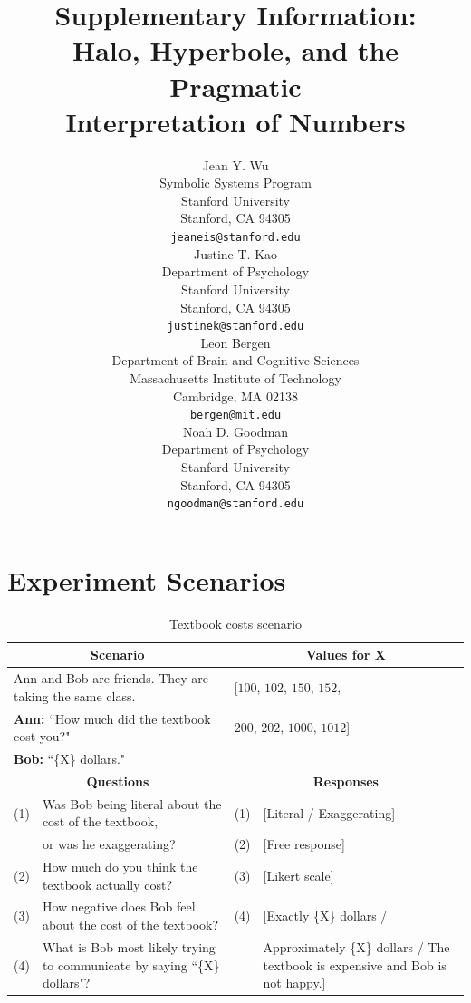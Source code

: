 \documentclass{article} %
\title{Supplementary Information:\\ Halo, Hyperbole, and the Pragmatic \\ Interpretation of Numbers}
\author{
Jean Y. Wu \\
Symbolic Systems Program\\
Stanford University\\
Stanford, CA 94305 \\
\texttt{jeaneis@stanford.edu} \\
\And
Justine T. Kao \\
Department of Psychology\\
Stanford University \\
Stanford, CA 94305 \\
\texttt{justinek@stanford.edu} \\
\AND
Leon Bergen \\
Department of Brain and Cognitive Sciences\\
Massachusetts Institute of Technology \\
Cambridge, MA 02138\\
\texttt{bergen@mit.edu} \\
\And
Noah D. Goodman \\
Department of Psychology\\
Stanford University \\ 
Stanford, CA 94305\\
\texttt{ngoodman@stanford.edu} \\
}
\begin{document}
\maketitle

\section{Experiment Scenarios}

\begin{table}[h]
\begin{tabular}{| p{0.15cm}  p{8.15cm}| p{0.15cm}p{4cm} |}\hline
\multicolumn{2}{|c|}{\textbf{Scenario}} & \multicolumn{2}{c|}{\textbf{Values for X}} \\\hline
\multicolumn{2}{|l|}{Ann and Bob are friends. They are taking the same class.} & \multicolumn{2}{l|}{[$100$, $102$, $150$, $152$,}\\
\multicolumn{2}{|l|}{\textbf{Ann:} ``How much did the textbook cost you?"} & \multicolumn{2}{l|}{$200$, $202$, $1000$, $1012$]}\\
\multicolumn{2}{|l|}{\textbf{Bob:} ``\{X\} dollars."} & \multicolumn{2}{l|}{}\\\hline
\multicolumn{2}{|c|}{\textbf{Questions}} & \multicolumn{2}{c|}{\textbf{Responses}} \\\hline
(1) & Was Bob being literal about the cost of the textbook, & (1) &[Literal / Exaggerating] \\
 & or was he exaggerating? & (2) & [Free response] \\
(2) & How much do you think the textbook actually cost? & (3) & [Likert scale] \\
(3) & How negative does Bob feel about the cost of the textbook? & (4) & [Exactly \{X\} dollars / \\
(4) & What is Bob most likely trying to communicate by saying  ``\{X\} dollars"? & & Approximately \{X\} dollars / The textbook is expensive and Bob is not happy.]\\\hline
\end{tabular}
\caption{Textbook costs scenario}
\label{tab:textbooktable}
\end{table}
\end{document}
